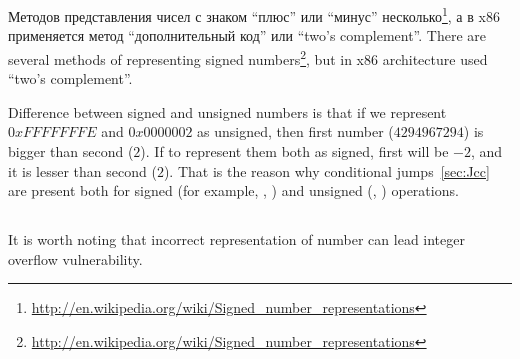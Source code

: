 ﻿\section{\SignedNumbersSectionName}
\label{sec:signednumbers}

\newcommand{\URLS}{\url{http://en.wikipedia.org/wiki/Signed_number_representations}}

\IFRU
{Методов представления чисел с знаком ``плюс'' или ``минус'' несколько\footnote{\URLS}, 
а в x86 применяется метод ``дополнительный код'' или ``two's complement''.}
{There are several methods of representing signed numbers\footnote{\URLS}, 
but in x86 architecture used ``two's complement''.}

{Difference between signed and unsigned numbers is that if we represent $0xFFFFFFFE$ and $0x0000002$ 
as unsigned, then first number ($4294967294$) is bigger than second ($2$). 
If to represent them both as signed, first will be $-2$, and it is lesser than second ($2$). 
That is the reason why conditional jumps~\ref{sec:Jcc} are present both for signed (for example, \JG, \JL) 
and unsigned (\JA, \JB) operations.}

\subsection{}

{It is worth noting that incorrect representation of number can lead integer overflow vulnerability.}

